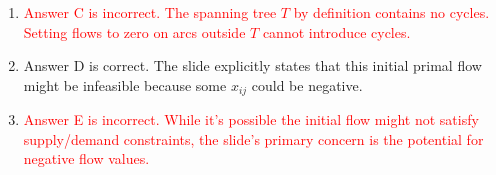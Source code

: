 \documentclass{article}%
\newcommand{\incorrect}[1]{\textcolor{red}{#1}}
\begin{document}
\begin{enumerate}
\begin{enumerate}
\item \incorrect{Answer C is incorrect.  The spanning tree $T$ by definition contains no cycles.  Setting flows to zero on arcs outside $T$ cannot introduce cycles.}%
\item Answer D is correct.  The slide explicitly states that this initial primal flow might be infeasible because some $x_{ij}$ could be negative.%
\item \incorrect{Answer E is incorrect. While it's possible the initial flow might not satisfy supply/demand constraints, the slide's primary concern is the potential for negative flow values.}%
\end{enumerate}%
\vspace{1em}%
\end{enumerate}

%
\end{document}

